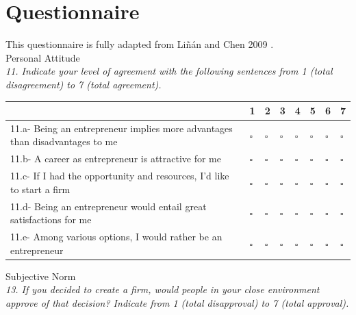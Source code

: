 \clearpage

\section{Questionnaire}\label{app:questionaire}

This questionnaire is fully adapted from Li{\~n}{\'a}n and Chen 2009 \cite{linan2009development}.
\\

\large{Personal Attitude}
\\
\emph{11. Indicate your level of agreement with the following sentences from 1 (total disagreement) to 7 (total agreement).}

\begin{table}[H]
\scriptsize	
\centering

\begin{tabular}{p{10cm}lllllll}
\toprule
                                                                             & 1         & 2         & 3         & 4         & 5         & 6         & 7         \\ \midrule
11.a- Being an entrepreneur implies more advantages than disadvantages to me & $\square$ & $\square$ & $\square$ & $\square$ & $\square$ & $\square$ & $\square$ \\
11.b- A career as entrepreneur is attractive for me                          & $\square$ & $\square$ & $\square$ & $\square$ & $\square$ & $\square$ & $\square$ \\
11.c- If I had the opportunity and resources, I'd like to start a firm       & $\square$ & $\square$ & $\square$ & $\square$ & $\square$ & $\square$ & $\square$ \\
11.d- Being an entrepreneur would entail great satisfactions for me          & $\square$ & $\square$ & $\square$ & $\square$ & $\square$ & $\square$ & $\square$ \\
11.e- Among various options, I would rather be an entrepreneur               & $\square$ & $\square$ & $\square$ & $\square$ & $\square$ & $\square$ & $\square$ \\ \bottomrule
\end{tabular}
\end{table}

\large{Subjective Norm}
\\
\emph{13. If you decided to create a firm, would people in your close environment approve of that decision? Indicate from 1 (total disapproval) to 7 (total approval).}

